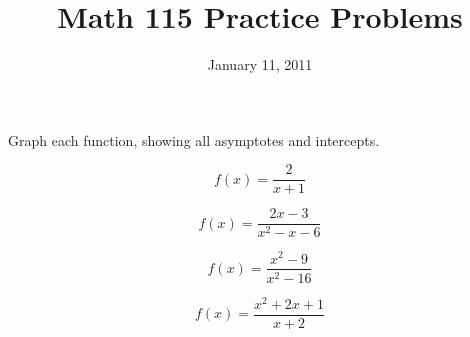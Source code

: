 \documentclass[fleqn,addpoints]{exam}
\title{Math 115 Practice Problems}
\date{January 11, 2011}
\begin{document}
\maketitle

Graph each function, showing all asymptotes and intercepts.
 
\begin{questions}

\question
\[
  f(x) = \frac{2}{x+1}
\]

\question
\[
  f(x) = \frac{2x-3}{x^2-x-6}
\]

\question
\[
  f(x) = \frac{x^2-9}{x^2-16}
\]

\question
\[
  f(x) = \frac{x^2+2x+1}{x+2}
\]

\end{questions}
\end{document}
